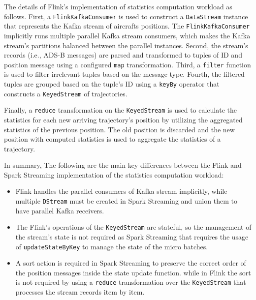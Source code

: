 \documentclass[]{article}
\begin{document}
\begin{itemize}
The details of Flink's implementation of statistics computation workload as follows. First, a \texttt{FlinkKafkaConsumer} is used to  construct a \texttt{DataStream} instance that represents the Kafka stream of aircrafts positions. The  \texttt{FlinkKafkaConsumer} implicitly runs multiple parallel Kafka stream consumers, which makes the Kafka stream's partitions balanced between the parallel instances. Second, the stream's records (i.e., ADS-B messages) are parsed and transformed to tuples of ID and position message using a configured \texttt{map} transformation. Third, a \texttt{filter} function is used to filter irrelevant tuples based on the message type. Fourth, the filtered tuples  are grouped based on the tuple's ID using a \texttt{keyBy} operator that constructs a \texttt{KeyedStream} of trajectories.\par Finally, 
a \texttt{reduce} transformation on the  \texttt{KeyedStream} is used to calculate the statistics for each new arriving trajectory's position by utilizing the aggregated statistics of the previous position. The old position is discarded and the new position with computed statistics is used to aggregate the statistics of a trajectory.

\end{itemize}

\par In summary, The following are the main key differences between the Flink and Spark Streaming implementation of the statistics computation workload:


\begin{itemize}
\item  Flink  handles  the parallel consumers of Kafka stream implicitly, while multiple \texttt{DStream} must be created in Spark Streaming and union them to have parallel Kafka receivers.
\item The Flink's operations of the \texttt{KeyedStream} are stateful, so  the  management of the stream's state is not required as Spark Streaming that requires the usage of \texttt{updateStateByKey} to manage the state of the micro batches.
\item A sort action is required in Spark Streaming to preserve the correct  order of the position messages inside the state update function. while in Flink the sort is not required by using a \texttt{reduce} transformation over the \texttt{KeyedStream} that processes the stream records item by item.
\end{itemize}
   
\end{document}
